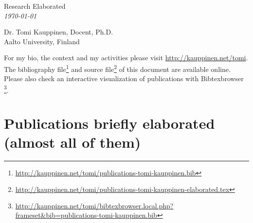 \documentclass[11pt,letterpaper]{article}
\def\name{Research Elaborated\\ \small{\textit{\today}}}
\begin{document}
{\huge \name}


\vspace{0.25in}

\begin{minipage}[t]{0.5\textwidth}
Dr. Tomi Kauppinen, Docent, Ph.D.\\
Aalto University, Finland \\

  \normalsize


\end{minipage}
\begin{minipage}[t]{0.5\textwidth}

\end{minipage}

\small For my bio, the context and my activities please visit
\url{http://kauppinen.net/tomi}.
The bibliography file\footnote{\url{http://kauppinen.net/tomi/publications-tomi-kauppinen.bib}}
and source
file\footnote{\url{http://kauppinen.net/tomi/publications-tomi-kauppinen-elaborated.tex}}
of this document are available online. Please also check
an interactive visualization of publications with
Bibtexbrowser
\footnote{\url{http://kauppinen.net/tomi/bibtexbrowser.local.php?frameset&bib=publications-tomi-kauppinen.bib}}.

\normalsize

\section*{Publications briefly elaborated (almost all of them)}
\end{document}
